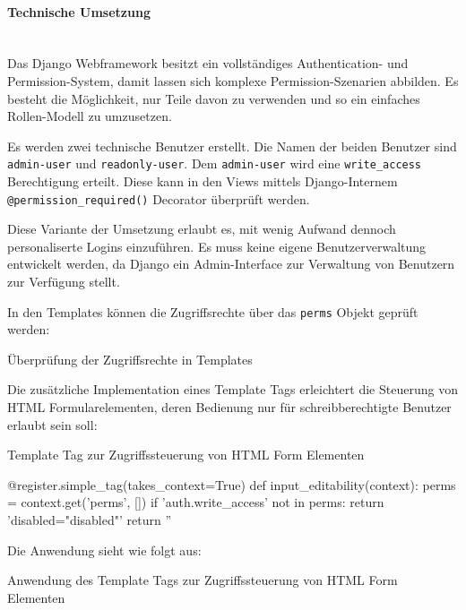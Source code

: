 \paragraph{Technische Umsetzung} \hspace{0pt} \\
Das Django Webframework besitzt ein vollständiges Authentication- und
Permission-System, damit lassen sich komplexe Permission-Szenarien
abbilden. Es besteht die Möglichkeit, nur Teile davon zu verwenden und
so ein einfaches Rollen-Modell zu umzusetzen.

Es werden zwei technische Benutzer
erstellt. Die Namen der beiden Benutzer sind 
 \texttt{admin-user} und \texttt{readonly-user}. Dem
\texttt{admin-user} wird eine \texttt{write\_access} Berechtigung erteilt. Diese
kann in den Views mittels Django-Internem \texttt{@permission\_required()}
Decorator überprüft werden.

Diese Variante der Umsetzung erlaubt es, mit wenig Aufwand dennoch personaliserte Logins
einzuführen. Es muss keine eigene Benutzerverwaltung entwickelt werden, da Django ein Admin-Interface zur Verwaltung von Benutzern zur Verfügung stellt.

In den Templates können die Zugriffsrechte über das \texttt{perms} Objekt geprüft werden:

\begin{listing}[H]
\caption{Überprüfung der Zugriffsrechte in Templates}
\end{listing}

Die zusätzliche Implementation eines Template Tags erleichtert die Steuerung von
HTML Formularelementen, deren Bedienung nur für schreibberechtigte Benutzer
erlaubt sein soll:

\begin{listing}[H]
\caption{Template Tag zur Zugriffssteuerung von HTML Form Elementen}
\begin{pythoncode}
@register.simple_tag(takes_context=True)
def input_editability(context):
    perms = context.get('perms', [])
    if 'auth.write_access' not in perms:
        return 'disabled="disabled"'
    return ''
\end{pythoncode}
\end{listing}
Die Anwendung sieht wie folgt aus:

\begin{listing}[H]
\caption{Anwendung des Template Tags zur Zugriffssteuerung von HTML Form Elementen }
\end{listing}

